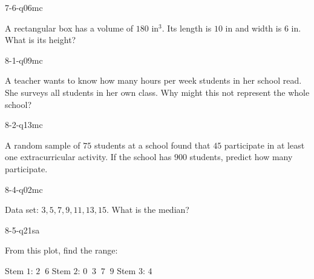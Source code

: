 \begin{practiceQuestion}{7-6-q06}{mc}
\begin{questionText}
A rectangular box has a volume of $180$ in$^3$. Its length is $10$ in and width is $6$ in. What is its height?
\end{questionText}
\end{practiceQuestion}

\begin{practiceQuestion}{8-1-q09}{mc}
\begin{questionText}
A teacher wants to know how many hours per week students in her school read. She surveys all students in her own class. Why might this not represent the whole school?
\end{questionText}
\end{practiceQuestion}

\begin{practiceQuestion}{8-2-q13}{mc}
\begin{questionText}
A random sample of $75$ students at a school found that $45$ participate in at least one extracurricular activity. If the school has $900$ students, predict how many participate.
\end{questionText}
\end{practiceQuestion}

\begin{practiceQuestion}{8-4-q02}{mc}
\begin{questionText}
Data set: $3, 5, 7, 9, 11, 13, 15$. What is the median?
\end{questionText}
\end{practiceQuestion}

\begin{practiceQuestion}{8-5-q21}{sa}
\begin{questionText}
From this plot, find the range:

Stem $1$: $2\;\;6$ \quad Stem $2$: $0\;\;3\;\;7\;\;9$ \quad Stem $3$: $4$
\end{questionText}
\end{practiceQuestion}

